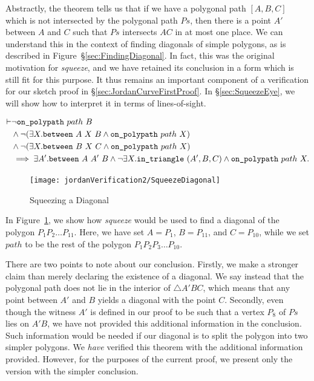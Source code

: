 Abstractly, the theorem tells us that if we have a polygonal path $[A,B,C]$ which is not intersected by the polygonal path $Ps$, then there is a point $A'$ between $A$ and $C$ such that $Ps$ intersects $AC$ in at most one place. We can understand this in the context of finding diagonals of simple polygons, as is described in Figure~\S\ref{sec:FindingDiagonal}. In fact, this was the original motivation for \emph{squeeze}, and we have retained its conclusion in a form which is still fit for this purpose. It thus remains an important component of a verification for our sketch proof in \S\ref{sec:JordanCurveFirstProof}. In \S\ref{sec:SqueezeEye}, we will show how to interpret it in terms of lines-of-sight.

\begin{equation}\label{eq:Squeeze}
  \begin{aligned}
    \vdash&\neg\texttt{on\_polypath}\ path\ B\\
    &\wedge \neg(\exists X. \texttt{between}\ A\ X\ B \wedge \texttt{on\_polypath}\ path\ X)\\
    &\wedge \neg(\exists X. \texttt{between}\ B\ X\ C \wedge \texttt{on\_polypath}\ path\ X)\\
    &\implies \exists A'. \texttt{between}\ A\ A'\ B \wedge \neg\exists X. \texttt{in\_triangle}\ (A',B,C) \wedge \texttt{on\_polypath}\ path\ X.
  \end{aligned}
\end{equation}

\begin{figure}
\centering\texttt{[image: jordanVerification2/SqueezeDiagonal]}
\caption{Squeezing a Diagonal}
\label{fig:SqueezeDiagonal}
\end{figure}

In Figure~\ref{fig:SqueezeDiagonal}, we show how \emph{squeeze} would be used to find a diagonal of the polygon $P_1P_2\ldots P_{11}$. Here, we have set $A = P_1$, $B = P_{11}$, and $C = P_{10}$, while we set $path$ to be the rest of the polygon $P_1P_2P_3\ldots P_{10}$. 

There are two points to note about our conclusion. Firstly, we make a stronger claim than merely declaring the existence of a diagonal. We say instead that the polygonal path does not lie in the interior of $\triangle A'BC$, which means that any point between $A'$ and $B$ yields a diagonal with the point $C$. Secondly, even though the witness $A'$ is defined in our proof to be such that a vertex $P_8$ of $Ps$ lies on $A'B$, we have not provided this additional information in the conclusion. Such information would be needed if our diagonal is to split the polygon into two simpler polygons. We \emph{have} verified this theorem with the additional information provided. However, for the purposes of the current proof, we present only the version with the simpler conclusion.


